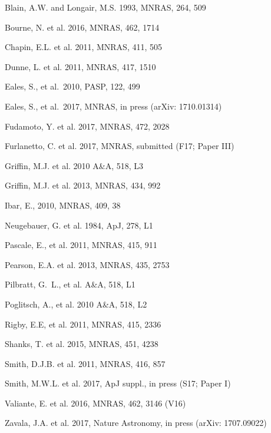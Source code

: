 \documentclass[useAMS,usenatbib]{mn2e}
\def\pasp{PASP}
\begin{document}
\begin{thebibliography}{}

 Blain, A.W. and Longair, M.S. 1993,
MNRAS, 264, 509

 Bourne, N. et al. 2016, MNRAS, 462, 1714

 Chapin, E.L. et al. 2011, MNRAS, 411, 505

 Dunne, L. et al. 2011, MNRAS, 417, 1510

 Eales, S., et al.\ 2010,  \pasp, 122, 499 

 Eales, S., et al.\ 2017, MNRAS, in press
(arXiv: 1710.01314)

 Fudamoto, Y. et al. 2017,
MNRAS, 472, 2028

 Furlanetto, C. et al. 2017,
MNRAS, submitted (F17; Paper III)

 Griffin, M.J. et al. 2010 A\&A, 518, L3

 Griffin, M.J. et al. 2013,
MNRAS, 434, 992

 Ibar, E., 2010, MNRAS, 409, 38

 Neugebauer, G. et al. 1984,
ApJ, 278, L1

 Pascale, E., et al. 2011, MNRAS, 415, 911 

 Pearson, E.A. et al. 2013, MNRAS, 435,
2753

 Pilbratt, G.~L., et al. A\&A, 518, L1

 Poglitsch, A., et al. 2010 A\&A, 518, L2

 Rigby, E.E, et al. 2011, MNRAS, 415, 2336 

 Shanks, T. et al. 2015, MNRAS, 451, 4238

 Smith, D.J.B. et al. 2011, MNRAS, 
416, 857

 Smith, M.W.L. et al. 2017, ApJ suppl., in press
(S17; Paper I)

 Valiante, E. et al. 2016, MNRAS, 462, 3146
(V16)

 Zavala, J.A. et al. 2017, Nature Astronomy,
in press (arXiv: 1707.09022)

\end{thebibliography}
\label{lastpage}
\end{document}
